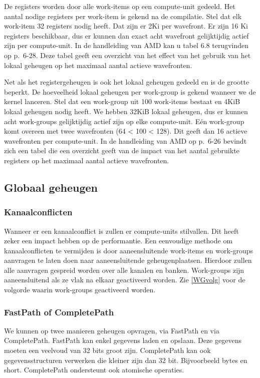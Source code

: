 De registers worden door alle work-items op een compute-unit gedeeld. Het aantal nodige registers per work-item is gekend na de compilatie. Stel dat elk work-item 32 registers nodig heeft. Dat zijn er 2Ki per wavefront. Er zijn 16 Ki registers beschikbaar, dus er kunnen dan exact acht wavefront gelijktijdig actief zijn per compute-unit. In de handleiding van AMD \cite{amd} kan u tabel 6.8 terugvinden op p.~6-28. Deze tabel geeft een overzicht van het effect van het gebruik van het lokaal geheugen op het maximaal aantal actieve wavefronten.

Net als het registergeheugen is ook het lokaal geheugen gedeeld en is de grootte beperkt. De hoeveelheid lokaal geheugen per work-group is gekend wanneer we de kernel lanceren. Stel dat een work-group uit 100 work-items bestaat en 4KiB lokaal geheugen nodig heeft. We hebben 32KiB lokaal geheugen, dus er kunnen acht work-groups gelijktijdig actief zijn op elke compute-unit. E\'en work-group komt overeen met twee wavefronten (64 < 100 < 128). Dit geeft dan 16 actieve wavefronten per compute-unit.  In de handleiding van AMD \cite{amd} op p.~6-26 bevindt zich een tabel die een overzicht geeft van de impact van het aantal gebruikte registers op het maximaal aantal actieve wavefronten.


\subsection{Globaal geheugen}
\subsubsection{Kanaalconflicten}
Wanneer er een kanaalconflict is zullen er compute-units stilvallen. Dit heeft zeker een impact hebben op de performantie. Een eenvoudige methode om kanaalconflicten te vermijden is door aaneensluitende work-items en work-groups aanvragen te laten doen naar aaneensluitende geheugenplaatsen. Hierdoor zullen alle aanvragen gespreid worden over alle kanalen en banken. Work-groups zijn aaneensluitend als ze vlak na elkaar geactiveerd worden. Zie \ref{WGvolg} voor de volgorde waarin work-groups geactiveerd worden. 

\subsubsection{FastPath of CompletePath}
We kunnen op twee manieren geheugen opvragen, via FastPath en via CompletePath. FastPath kan enkel gegevens laden en opslaan. Deze gegevens moeten een veelvoud van 32 bits groot zijn. CompletePath kan ook gegevensstructuren verwerken die kleiner zijn dan 32 bit. Bijvoorbeeld bytes en short. CompletePath ondersteunt ook atomische operaties.

